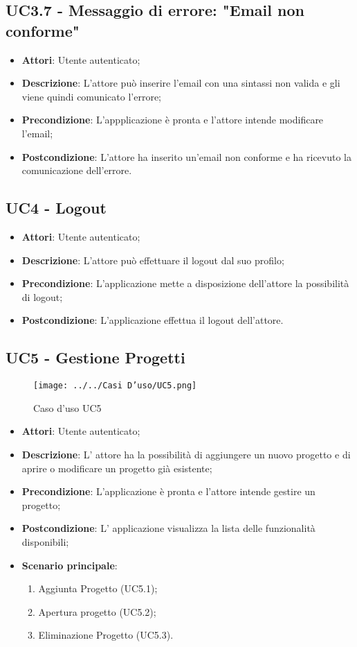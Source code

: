 \subsection{UC3.7 - Messaggio di errore: "Email non conforme"} 
\label{ssec:UC3.7} 
\begin{itemize} 
\item \textbf{Attori}: Utente autenticato;
\item \textbf{Descrizione}: L'attore può inserire l'email con una sintassi non valida e gli viene quindi comunicato l'errore;
\item \textbf{Precondizione}: L'appplicazione è pronta e l'attore intende modificare l'email;
\item \textbf{Postcondizione}: L'attore ha inserito un'email non conforme e ha ricevuto la comunicazione dell'errore.
\end{itemize} 
\newpage
\subsection{UC4 - Logout} 
\label{ssec:UC4} 
\begin{itemize} 
\item \textbf{Attori}: Utente autenticato;
\item \textbf{Descrizione}: L'attore può effettuare il logout dal suo profilo;
\item \textbf{Precondizione}: L’applicazione mette a disposizione dell’attore la possibilità di logout;
\item \textbf{Postcondizione}: L'applicazione effettua il logout dell'attore.
\end{itemize} 
\newpage
\subsection{UC5 - Gestione Progetti} 
\label{ssec:UC5} 
\begin{figure}[h!] 
\centering 
\texttt{[image: ../../Casi D'uso/UC5.png]} 
\caption{Caso d'uso UC5} 
 \end{figure} 
\begin{itemize} 
\item \textbf{Attori}: Utente autenticato;
\item \textbf{Descrizione}: L’ attore ha la possibilità di aggiungere un nuovo progetto e di aprire o modificare un progetto già esistente;
\item \textbf{Precondizione}: L'applicazione è pronta e l'attore intende gestire un progetto;
\item \textbf{Postcondizione}: L’ applicazione visualizza la lista delle funzionalità disponibili;
\item \textbf{Scenario principale}: \begin{enumerate}\item Aggiunta Progetto (UC5.1);\item Apertura progetto (UC5.2);\item Eliminazione Progetto (UC5.3). 
 \end{enumerate}
\end{itemize} 
\newpage

